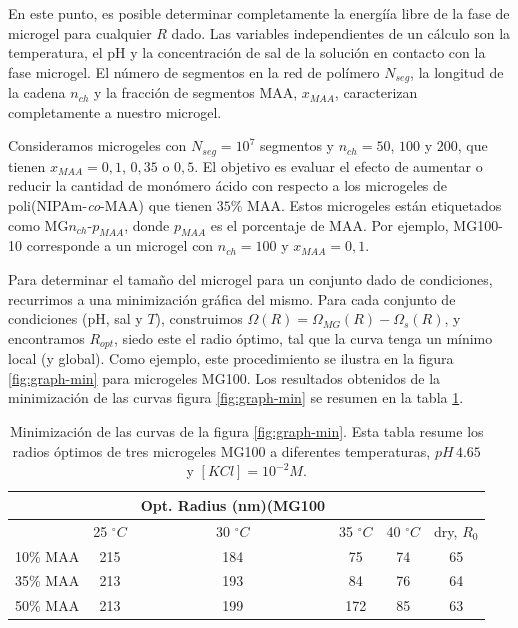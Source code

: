 En este punto, es posible determinar completamente la energí\'ia libre de la fase de microgel para cualquier $R$ dado.
Las variables independientes de un c\'alculo son la temperatura, el pH y la concentraci\'on de sal de la soluci\'on en contacto con la fase microgel.
El n\'umero de segmentos en la red de pol\'imero $N_{seg}$, la longitud de la cadena $n_{ch}$ y la fracci\'on de segmentos MAA, $x_{MAA}$, caracterizan completamente a nuestro microgel.


Consideramos microgeles con $N_{seg}=10^7$ segmentos y $n_{ch}=50$, $100$ y $200$, que tienen $x_{MAA}=0,1$, $0,35$ o $0,5$.
El objetivo es evaluar el efecto de aumentar o reducir la cantidad de mon\'omero \'acido con respecto a los microgeles de poli(NIPAm-\emph{co}-MAA) que tienen $35\%$ MAA. %
Estos microgeles est\'an etiquetados como MG$n_{ch}$-$p_{MAA}$, donde $p_{MAA}$ es el porcentaje de MAA.
Por ejemplo, MG100-10 corresponde a un  microgel con $n_{ch}=100$ y $x_{MAA}=0,1$.


Para determinar el tama\~no del microgel para un conjunto dado de condiciones, recurrimos a una minimizaci\'on gr\'afica del mismo.
Para cada conjunto de condiciones (pH, sal y $T$), construimos $\Omega(R)=\Omega_{MG}(R)-\Omega_{s}(R)$, y encontramos $R_{opt }$, siedo este el radio \'optimo, tal que la curva tenga un m\'inimo local (y global).
Como ejemplo, este procedimiento se ilustra en la figura \ref{fig:graph-min} para microgeles MG100.
Los resultados obtenidos de la minimizaci\'on de las curvas figura \ref{fig:graph-min} se resumen en la tabla \ref{table:optimal-R}.

\begin{table}[!htb]
\centering
\small
  \begin{tabular}{|lccccc|}
   \hline %
    	&&   Opt. Radius (nm)(MG100 & && \\
    	\hline
      & {25 $^\circ C$} & {30 $^\circ C$} & {35 $^\circ C$} & {40 $^\circ C$} & {dry, $R_0$} \\
      \hline
    10\% MAA & 215 &  184 &  75  &  74 & 65\\
    35\% MAA &  213 &  193 &  84 & 76 & 64\\
    50\% MAA &  213 & 199 &  172 & 85 & 63\\
    \hline
  \end{tabular}
 \caption{Minimizaci\'on de las curvas de la  figura \ref{fig:graph-min}.
 	Esta tabla resume los radios \'optimos de tres microgeles MG100 a diferentes temperaturas, $pH\,4.65$ y $[KCl]=10^{-2}M$.}
\label{table:optimal-R} 
\end{table}


